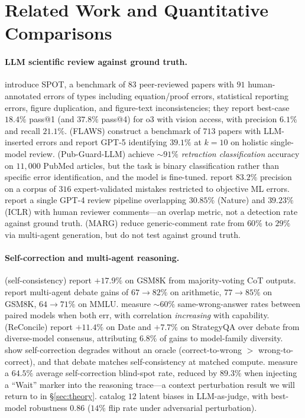 \documentclass[11pt]{article}
\theoremstyle{definition}
\begin{document}


\section{Related Work and Quantitative Comparisons}
\label{sec:related}

\paragraph{LLM scientific review against ground truth.} \citet{son2025spot} introduce SPOT, a benchmark of $83$ peer-reviewed papers with $91$ human-annotated errors of types including equation/proof errors, statistical reporting errors, figure duplication, and figure-text inconsistencies; they report best-case $18.4\%$ pass@1 (and $37.8\%$ pass@4) for o3 with vision access, with precision $6.1\%$ and recall $21.1\%$. \citet{xi2025flaws} (FLAWS) construct a benchmark of $713$ papers with LLM-inserted errors and report GPT-5 identifying $39.1\%$ at $k = 10$ on holistic single-model review. \citet{chen2025pubguard} (Pub-Guard-LLM) achieve $\sim$$91\%$ \emph{retraction classification} accuracy on $11{,}000$ PubMed articles, but the task is binary classification rather than specific error identification, and the model is fine-tuned. \citet{toerris2025} report $83.2\%$ precision on a corpus of $316$ expert-validated mistakes restricted to objective ML errors. \citet{liang2024can} report a single GPT-4 review pipeline overlapping $30.85\%$ (Nature) and $39.23\%$ (ICLR) with human reviewer comments---an overlap metric, not a detection rate against ground truth. \citet{darcy2024marg} (MARG) reduce generic-comment rate from $60\%$ to $29\%$ via multi-agent generation, but do not test against ground truth.

\paragraph{Self-correction and multi-agent reasoning.} \citet{wang2023self} (self-consistency) report $+17.9\%$ on GSM8K from majority-voting CoT outputs. \citet{du2023debate} report multi-agent debate gains of $67{\to}82\%$ on arithmetic, $77{\to}85\%$ on GSM8K, $64{\to}71\%$ on MMLU. \citet{kim2025correlated} measure $\sim$$60\%$ same-wrong-answer rates between paired models when both err, with correlation \emph{increasing} with capability. \citet{chen2024reconcile} (ReConcile) report $+11.4\%$ on Date and $+7.7\%$ on StrategyQA over debate from diverse-model consensus, attributing $6.8\%$ of gains to model-family diversity. \citet{huang2024self} show self-correction degrades without an oracle (correct-to-wrong $>$ wrong-to-correct), and that debate matches self-consistency at matched compute. \citet{tsui2025selfcorrection} measure a $64.5\%$ average self-correction blind-spot rate, reduced by $89.3\%$ when injecting a ``Wait'' marker into the reasoning trace---a context perturbation result we will return to in \S\ref{sec:theory}. \citet{li2024llmjudge} catalog $12$ latent biases in LLM-as-judge, with best-model robustness $0.86$ ($14\%$ flip rate under adversarial perturbation).
\end{document}
